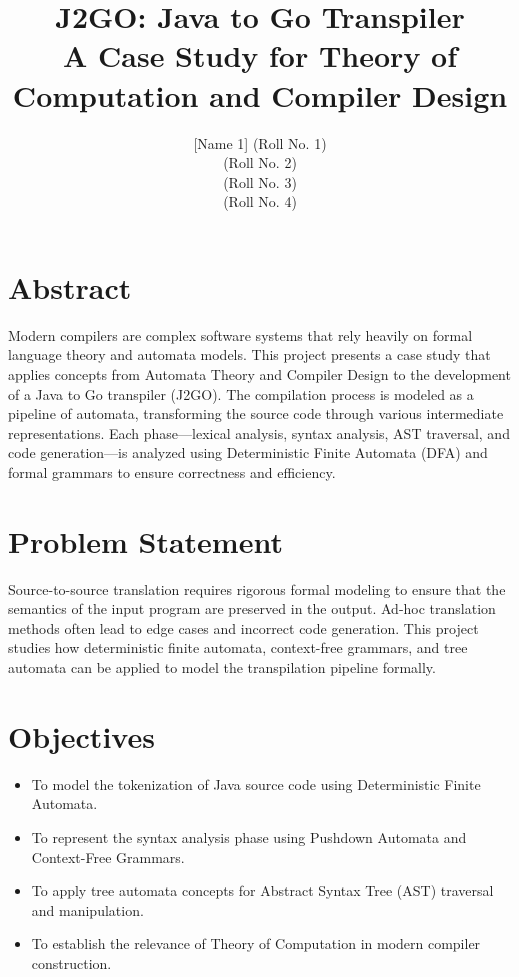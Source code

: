 \documentclass[12pt,a4paper]{article}
\title{
\textbf{J2GO: Java to Go Transpiler} \\
\vspace{0.3cm}
\large A Case Study for Theory of Computation and Compiler Design
}
\author{
[Name 1] (Roll No. 1)\\
[Name 2] (Roll No. 2)\\
[Name 3] (Roll No. 3)\\
[Name 4] (Roll No. 4)
}
\date{}
\begin{document}
\maketitle

\section*{Abstract}

Modern compilers are complex software systems that rely heavily on formal language theory and automata models. This project presents a case study that applies concepts from Automata Theory and Compiler Design to the development of a Java to Go transpiler (J2GO). The compilation process is modeled as a pipeline of automata, transforming the source code through various intermediate representations. Each phase—lexical analysis, syntax analysis, AST traversal, and code generation—is analyzed using Deterministic Finite Automata (DFA) and formal grammars to ensure correctness and efficiency.

\section*{Problem Statement}

Source-to-source translation requires rigorous formal modeling to ensure that the semantics of the input program are preserved in the output. Ad-hoc translation methods often lead to edge cases and incorrect code generation. This project studies how deterministic finite automata, context-free grammars, and tree automata can be applied to model the transpilation pipeline formally.

\section*{Objectives}

\begin{itemize}
    \item To model the tokenization of Java source code using Deterministic Finite Automata.
    \item To represent the syntax analysis phase using Pushdown Automata and Context-Free Grammars.
    \item To apply tree automata concepts for Abstract Syntax Tree (AST) traversal and manipulation.
    \item To establish the relevance of Theory of Computation in modern compiler construction.
\end{itemize}
\end{document}
